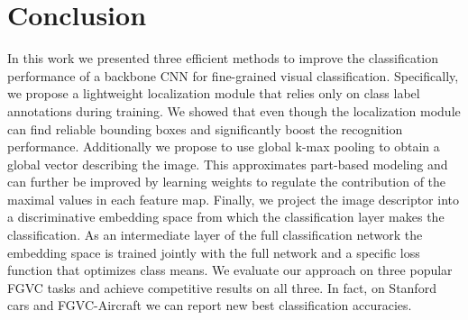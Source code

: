 \documentclass[10pt,twocolumn,letterpaper]{article}
\begin{document}
\section{Conclusion}
In this work we presented three efficient methods to improve the classification performance of a backbone CNN for fine-grained visual classification. Specifically, we propose a lightweight localization module that relies only on class label annotations during training. We showed that even though the localization module can find reliable bounding boxes and significantly boost the recognition performance. Additionally we propose to use global k-max pooling to obtain a global vector describing the image. This approximates part-based modeling and can further be improved by learning weights to regulate the contribution of the maximal values in each feature map. Finally, we project the image descriptor into a discriminative embedding space from which the classification layer makes the classification. As an intermediate layer of the full classification network the embedding space is trained jointly with the full network and a specific loss function that optimizes class means. We evaluate our approach on three popular FGVC tasks and achieve competitive results on all three. In fact, on Stanford cars and FGVC-Aircraft we can report new best classification accuracies. 

\clearpage
{\small


}
\end{document}
